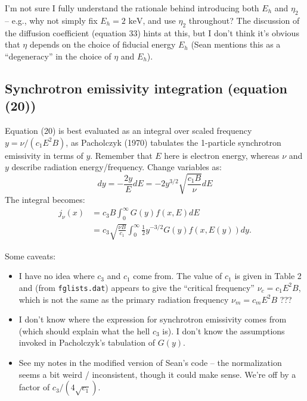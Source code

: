 \documentclass[10pt]{article}
\begin{document}
I'm not sure I fully understand the rationale behind introducing both $E_h$ and
$\eta_2$ -- e.g., why not simply fix $E_h = \text{2 keV}$, and use $\eta_2$
throughout?  The discussion of the diffusion coefficient (equation 33) hints at
this, but I don't think it's obvious that $\eta$ depends on the choice of
fiducial energy $E_h$ (Sean mentions this as a ``degeneracy'' in the choice of
$\eta$ and $E_h$).

\subsection{Synchrotron emissivity integration (equation (20))}

Equation (20) is best evaluated as an integral over scaled frequency
$y = \nu / (c_1 E^2 B)$, as Pacholczyk (1970) tabulates the 1-particle
synchrotron emissivity in terms of $y$.  Remember that $E$ here is electron
energy, whereas $\nu$ and $y$ describe radiation energy/frequency.
Change variables as:
\[
    dy = -\frac{2y}{E} dE = -2 y^{3/2} \sqrt{\frac{c_1 B}{\nu}} dE
\]
The integral becomes:
\begin{align*}
    j_\nu(x) &= c_3 B \int_0^\infty G(y) f(x,E) dE \\
             &= c_3 \sqrt{\frac{\nu B}{c_1}}
                \int_0^\infty \frac{1}{2} y^{-3/2} G(y) f(x,E(y)) dy\text{.}
\end{align*}

Some caveats:
\begin{itemize}
    \item I have no idea where $c_3$ and $c_1$ come from.  The value of $c_1$
        is given in Table 2 and (from {\tt fglists.dat}) appears to give the
        ``critical frequency'' $\nu_c = c_1 E^2 B$, which is not the same as
        the primary radiation frequency $\nu_m = c_m E^2 B$ ???
    \item I don't know where the expression for synchrotron emissivity comes
        from (which should explain what the hell $c_3$ is).  I don't know the
        assumptions invoked in Pacholczyk's tabulation of $G(y)$.
    \item See my notes in the modified version of Sean's code -- the
        normalization seems a bit weird / inconsistent, though it could make
        sense.  We're off by a factor of $c_3 / (4 \sqrt{c_1})$.
\end{itemize}
\end{document}
